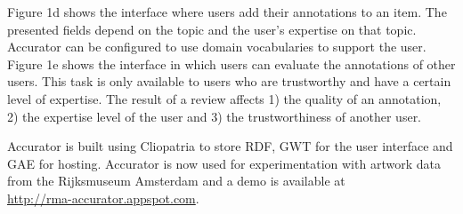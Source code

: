 Figure 1d shows the interface where users add their annotations to an item. The presented fields depend on the topic and the user's expertise on that topic. 
Accurator can be configured to use domain vocabularies to support the user. Figure 1e shows the interface in which users can evaluate the annotations of other users. This task is only available to users who are trustworthy and have a certain level of expertise. The result of a review affects 1) the quality of an annotation, 2) the expertise level of the user and 3) the trustworthiness of another user.

Accurator is built using Cliopatria to store RDF, GWT for the user interface and GAE for hosting. Accurator is now used for experimentation with artwork data from the Rijksmuseum Amsterdam and a demo is available at 
\\ \url{http://rma-accurator.appspot.com}.



